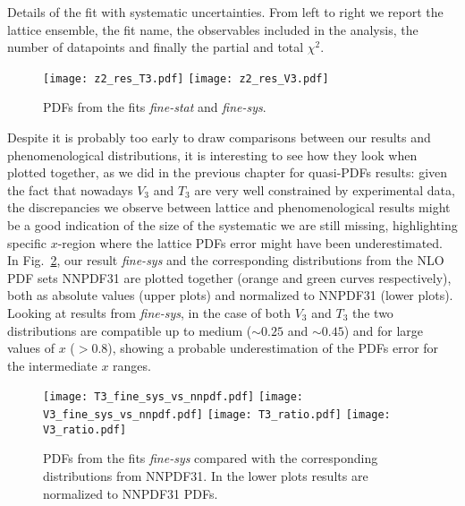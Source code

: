\begin{table}[t]
    \renewcommand*{\arraystretch}{1.60}
    \scriptsize
    \centering
    
    \vspace{0.3cm}
    \caption{Details of the fit with systematic uncertainties. 
	From left to right we report the lattice ensemble, the fit name, 
	the observables included in the analysis, the number of datapoints and finally
	the partial and total $\chi^2$.}
    \label{tab:chi2_sys}
\end{table}
    
\begin{figure}[h!]
    \center
    \texttt{[image: z2\_res\_T3.pdf]}
    \texttt{[image: z2\_res\_V3.pdf]}
    \caption{PDFs from the fits \textit{fine-stat} and \textit{fine-sys}.}
    \label{fig::fits_z2}
\end{figure}

%
Despite it is probably too early to draw comparisons between our results and phenomenological distributions, 
it is interesting to see how they look when plotted together, as we did in the previous chapter for
quasi-PDFs results: given the fact that nowadays $V_3$ and $T_3$ are
very well constrained by experimental data, the discrepancies we observe between lattice and phenomenological results
might be a good indication of the size of the systematic we are still missing, highlighting specific $x$-region
where the lattice PDFs error might have been underestimated. 
In Fig.~\ref{fig::fits_ratio},
our result \textit{fine-sys} and the corresponding distributions from the NLO PDF sets
NNPDF31 \cite{Ball:2017nwa} are plotted together (orange and green curves respectively), both as
absolute values (upper plots) and normalized to NNPDF31 (lower plots). 
Looking at results from \textit{fine-sys}, in the case of both $V_3$ and $T_3$ the two distributions are compatible 
up to medium ($\sim 0.25$ and $\sim 0.45 $)
and for large values of $x$ ($ >0.8$), showing a probable underestimation of the PDFs error for the intermediate $x$ ranges. 
\begin{figure}[h!]
    \center
    \texttt{[image: T3\_fine\_sys\_vs\_nnpdf.pdf]}
    \texttt{[image: V3\_fine\_sys\_vs\_nnpdf.pdf]}
    \texttt{[image: T3\_ratio.pdf]}
    \texttt{[image: V3\_ratio.pdf]}
    \caption{PDFs from the fits \textit{fine-sys} compared with the corresponding distributions from NNPDF31. 
    In the lower plots results are normalized to NNPDF31 PDFs.}
    \label{fig::fits_ratio}
\end{figure}


